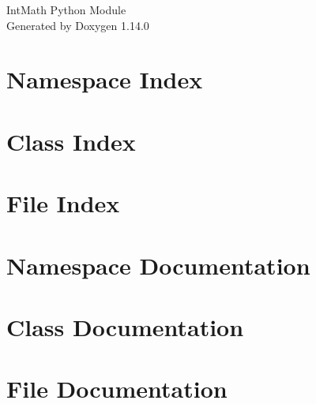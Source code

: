\documentclass[twoside]{book}
\newcommand{\+}{\discretionary{\mbox{\scriptsize$\hookleftarrow$}}{}{}}
\newcommand{\clearemptydoublepage}{%
    \newpage{\pagestyle{empty}\cleardoublepage}%
  }
\begin{document}
  \raggedbottom
    \hypersetup{pageanchor=false,
                bookmarksnumbered=true,
                pdfencoding=unicode
               }
  \begin{titlepage}
  \vspace*{7cm}
  \begin{center}%
  {\Large Int\+Math Python Module}\\
  \vspace*{1cm}
  {\large Generated by Doxygen 1.14.0}\\
  \end{center}
  \end{titlepage}
  \clearemptydoublepage
  \tableofcontents
  \clearemptydoublepage
  \hypersetup{pageanchor=true}


\chapter{Namespace Index}

\chapter{Class Index}

\chapter{File Index}

\chapter{Namespace Documentation}





\chapter{Class Documentation}

\chapter{File Documentation}










  \backmatter
  \newpage
  \clearemptydoublepage
  \printindex
\end{document}
